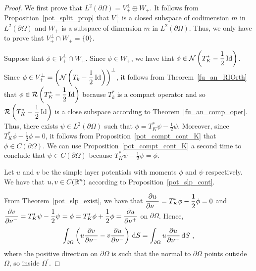\begin{proof}
 We first prove that
$\displaystyle L^2(\partial \Omega) = V_+^\perp \oplus W_+$.  It
follows from Proposition~\ref{pot_split_prop} that
$\displaystyle V_+^\perp$ is a
closed subspace of codimension $m$ in
$\displaystyle L^2(\partial \Omega)$ and $W_+$
is a subspace of dimension $m$ in
$\displaystyle L^2(\partial \Omega)$.  Thus, we
only have to prove that $\displaystyle V_+^\perp \cap W_+ = \{0\}$.

Suppose that $\displaystyle \phi \in V_+^\perp \cap W_+$.
Since $\phi \in W_+$, we have that
$\displaystyle \phi \in \mathcal{N} \left(T^\ast_K - \frac{1}{2} \operatorname{Id}\right)$.
Since $\displaystyle \phi \in V_+^\perp
= \left(\mathcal{N} \left(T_k -\frac{1}{2} \operatorname{Id}\right)\right)^\perp$,
it follows from Theorem~\ref{fu_an_RIOrth} that
$\displaystyle \phi \in \mathcal{R} \left( T^\ast_K - \frac{1}{2} \operatorname{Id}\right)$
because $\displaystyle T_k^\ast$ is a compact operator
and so $\displaystyle \mathcal{R} \left( T^\ast_K - \frac{1}{2} \operatorname{Id}\right)$
is a close subspace according to Theorem~\ref{fu_an_comp_oper}.  Thus, there
exists $\displaystyle \psi \in L^2(\partial \Omega)$ such that
$\displaystyle \phi = T^\ast_K \psi - \frac{1}{2} \psi$.  Moreover,
since $\displaystyle T^\ast_K\phi - \frac{1}{2} \phi = 0$, it follows
from Proposition~\ref{pot_compt_cont_K} that
$\phi \in C(\partial \Omega)$.  We can use 
Proposition~\ref{pot_compt_cont_K} a second time to conclude that
$\psi \in C(\partial \Omega)$ because
$\displaystyle T^\ast_K \psi - \frac{1}{2} \psi = \phi$.

Let $u$ and $v$ be the simple layer potentials with moments $\phi$ and
$\psi$ respectively.  We have that $\displaystyle u,v \in C(\mathbb{R}^n)$
according to Proposition~\ref{pot_slp_cont}.

From Theorem~\ref{pot_slp_exist}, we have
that
$\displaystyle \frac{\partial{u}}{\partial \mathbf{\nu}^-} = T^\ast_K \phi - \frac{1}{2} \phi = 0$
and
$\displaystyle \frac{\partial{v}}{\partial \mathbf{\nu}^-} = T^\ast_K \psi - \frac{1}{2} \psi
= \phi = T^\ast_K \phi + \frac{1}{2} \phi
= \frac{\partial{u}}{\partial \mathbf{\nu}^+}$
on $\partial \Omega$.  Hence,
\begin{equation} \label{pot_L2_split1_E1}
\int_{\partial \Omega} \left( u \frac{\partial{v}}{\partial \mathbf{\nu}^-}
- v \frac{\partial{u}}{\partial \mathbf{\nu}^-} \right) \,\mathrm{d}{S}
= \int_{\partial \Omega} u \frac{\partial{u}}{\partial \mathbf{\nu}^+} \,\mathrm{d}{S} \ ,
\end{equation}
where the positive direction on $\partial \Omega$ is such that the
normal to $\partial \Omega$ points outside $\Omega$, so inside
$\displaystyle \Omega^{\prime}$.


\end{proof}
